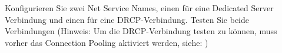     \item Konfigurieren Sie zwei Net Service Names, einen f\"ur eine Dedicated Server Verbindung und einen f\"ur eine DRCP-Verbindung. Testen Sie beide Verbindungen (Hinweis: Um die DRCP-Verbindung testen zu k\"onnen, muss vorher das Connection Pooling aktiviert werden, siehe: )
